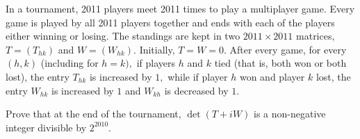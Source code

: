 In a tournament, 2011 players meet 2011 times to play a multiplayer game. Every game is played by all 2011 players together and ends with each of the players either winning or losing. The standings are kept in two $2011\times 2011$ matrices, $T=(T_{hk})$ and $W=(W_{hk}).$ Initially, $T=W=0.$ After every game, for every $(h,k)$ (including for $h=k),$ if players $h$ and $k$ tied (that is, both won or both lost), the entry $T_{hk}$ is increased by $1,$ while if player $h$ won and player $k$ lost, the entry $W_{hk}$ is increased by $1$ and $W_{kh}$ is decreased by $1.$

Prove that at the end of the tournament, $\det(T+iW)$ is a non-negative integer divisible by $2^{2010}.$